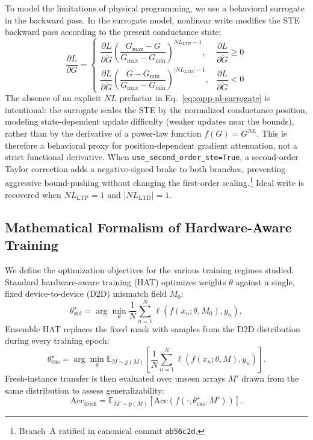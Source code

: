 To model the limitations of physical programming, we use a behavioral surrogate in the backward pass. In the surrogate model, nonlinear write modifies the STE backward pass according to the present conductance state:
\begin{equation}
    \frac{\partial L}{\partial G}
    =
    \begin{cases}
        \dfrac{\partial L}{\partial \tilde{G}}
        \left(\dfrac{G_{\max}-G}{G_{\max}-G_{\min}}\right)^{NL_{\mathrm{LTP}}-1},
        & \dfrac{\partial L}{\partial \tilde{G}} \ge 0 \\[10pt]
        \dfrac{\partial L}{\partial \tilde{G}}
        \left(\dfrac{G-G_{\min}}{G_{\max}-G_{\min}}\right)^{|NL_{\mathrm{LTD}}|-1},
        & \dfrac{\partial L}{\partial \tilde{G}} < 0
    \end{cases}
\label{eq:supp-nl-surrogate}
\end{equation}
The absence of an explicit $NL$ prefactor in Eq.~\ref{eq:supp-nl-surrogate} is intentional: the surrogate scales the STE by the normalized conductance position, modeling state-dependent update difficulty (weaker updates near the bounds), rather than by the derivative of a power-law function $f(G)=G^{NL}$.
This is therefore a behavioral proxy for position-dependent gradient attenuation, not a strict functional derivative.
When \texttt{use\_second\_order\_ste=True}, a second-order Taylor correction adds a negative-signed brake to both branches, preventing aggressive bound-pushing without changing the first-order scaling.\footnote{Branch~A ratified in canonical commit \texttt{ab56c2d}.}
Ideal write is recovered when $NL_{\mathrm{LTP}}=1$ and $|NL_{\mathrm{LTD}}|=1$.


\subsection{Mathematical Formalism of Hardware-Aware Training}
\label{subsec:supp-hat-math}

We define the optimization objectives for the various training regimes studied. Standard hardware-aware training (HAT) optimizes weights $\theta$ against a single, fixed device-to-device (D2D) mismatch field $M_0$:
\begin{equation}
    \theta_{\mathrm{std}}^{\star}=\arg\min_{\theta}\frac{1}{N}\sum_{n=1}^{N}\ell\!\left(f(x_{n};\theta,M_{0}),y_{n}\right),
\label{eq:hat-standard}
\end{equation}
Ensemble HAT replaces the fixed mask with samples from the D2D distribution during every training epoch:
\begin{equation}
    \theta_{\mathrm{ens}}^{\star}=\arg\min_{\theta}\mathbb{E}_{M\sim p(M)}
    \left[\frac{1}{N}\sum_{n=1}^{N}\ell\!\left(f(x_{n};\theta,M),y_{n}\right)\right].
\label{eq:hat-ensemble-distribution}
\end{equation}
Fresh-instance transfer is then evaluated over unseen arrays $M'$ drawn from the same distribution to assess generalizability:
\begin{equation}
    \mathrm{Acc}_{\mathrm{fresh}}=\mathbb{E}_{M'\sim p(M)}\!\left[\mathrm{Acc}\!\left(f(\cdot;\theta_{\mathrm{ens}}^{\star},M')\right)\right].
\label{eq:fresh-instance}
\end{equation}

